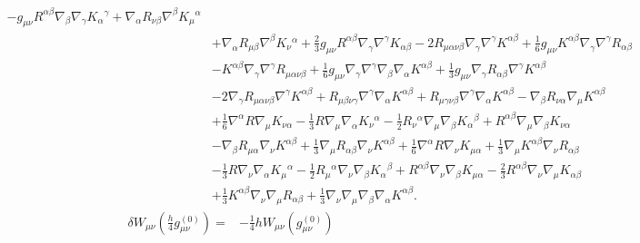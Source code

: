\documentclass[10pt,letterpaper]{article}
\begin{document}
\begin{align}
 -  g_{\mu \nu} R^{\alpha \beta} \nabla_{\beta}\nabla_{\gamma}K_{\alpha}{}^{\gamma}
 + \nabla_{\alpha}R_{\nu \beta} \nabla^{\beta}K_{\mu}{}^{\alpha}\nonumber\\
& + \nabla_{\alpha}R_{\mu \beta} \nabla^{\beta}K_{\nu}{}^{\alpha}
 + \tfrac{2}{3} g_{\mu \nu} R^{\alpha \beta} \nabla_{\gamma}\nabla^{\gamma}K_{\alpha \beta}
 - 2 R_{\mu \alpha \nu \beta} \nabla_{\gamma}\nabla^{\gamma}K^{\alpha \beta}
 + \tfrac{1}{6} g_{\mu \nu} K^{\alpha \beta} \nabla_{\gamma}\nabla^{\gamma}R_{\alpha \beta}\nonumber\\
& -  K^{\alpha \beta} \nabla_{\gamma}\nabla^{\gamma}R_{\mu \alpha \nu \beta}
 + \tfrac{1}{6} g_{\mu \nu} \nabla_{\gamma}\nabla^{\gamma}\nabla_{\beta}\nabla_{\alpha}K^{\alpha \beta}
 + \tfrac{1}{3} g_{\mu \nu} \nabla_{\gamma}R_{\alpha \beta} \nabla^{\gamma}K^{\alpha \beta}\nonumber\\
& - 2 \nabla_{\gamma}R_{\mu \alpha \nu \beta} \nabla^{\gamma}K^{\alpha \beta}
 + R_{\mu \beta \nu \gamma} \nabla^{\gamma}\nabla_{\alpha}K^{\alpha \beta}
 + R_{\mu \gamma \nu \beta} \nabla^{\gamma}\nabla_{\alpha}K^{\alpha \beta}
 -  \nabla_{\beta}R_{\nu \alpha} \nabla_{\mu}K^{\alpha \beta}\nonumber\\
& + \tfrac{1}{6} \nabla^{\alpha}R \nabla_{\mu}K_{\nu \alpha}
 -  \tfrac{1}{3} R \nabla_{\mu}\nabla_{\alpha}K_{\nu}{}^{\alpha}
 -  \tfrac{1}{2} R_{\nu}{}^{\alpha} \nabla_{\mu}\nabla_{\beta}K_{\alpha}{}^{\beta}
 + R^{\alpha \beta} \nabla_{\mu}\nabla_{\beta}K_{\nu \alpha}\nonumber\\
& -  \nabla_{\beta}R_{\mu \alpha} \nabla_{\nu}K^{\alpha \beta}
 + \tfrac{1}{3} \nabla_{\mu}R_{\alpha \beta} \nabla_{\nu}K^{\alpha \beta}
 + \tfrac{1}{6} \nabla^{\alpha}R \nabla_{\nu}K_{\mu \alpha}
 + \tfrac{1}{3} \nabla_{\mu}K^{\alpha \beta} \nabla_{\nu}R_{\alpha \beta}\nonumber\\
& -  \tfrac{1}{3} R \nabla_{\nu}\nabla_{\alpha}K_{\mu}{}^{\alpha}
 -  \tfrac{1}{2} R_{\mu}{}^{\alpha} \nabla_{\nu}\nabla_{\beta}K_{\alpha}{}^{\beta}
 + R^{\alpha \beta} \nabla_{\nu}\nabla_{\beta}K_{\mu \alpha}
 -  \tfrac{2}{3} R^{\alpha \beta} \nabla_{\nu}\nabla_{\mu}K_{\alpha \beta}\nonumber\\
& + \tfrac{1}{3} K^{\alpha \beta} \nabla_{\nu}\nabla_{\mu}R_{\alpha \beta}
 + \tfrac{1}{3} \nabla_{\nu}\nabla_{\mu}\nabla_{\beta}\nabla_{\alpha}K^{\alpha \beta}.
\end{align}
\begin{align}
\delta W_{\mu\nu}(\tfrac{h}{4}g_{\mu\nu}^{(0)})={}&-\frac14 h W_{\mu\nu}(g_{\mu\nu}^{(0)})
\end{align}
\end{document}
